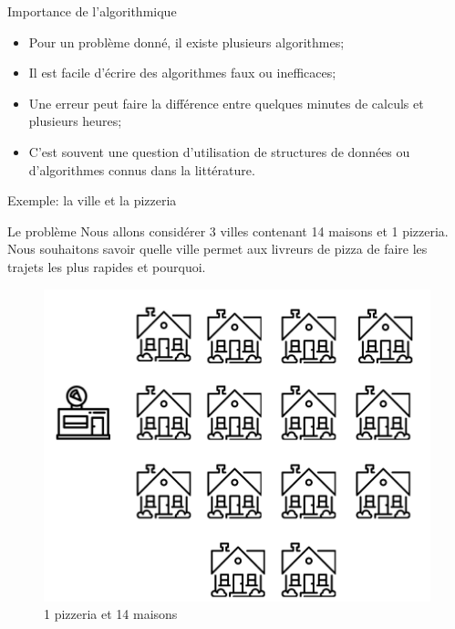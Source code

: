 \documentclass[10pt,xcolor=dvipsnames]{beamer}
\begin{document}
\begin{frame}{Importance de l'algorithmique}
    \begin{itemize}
        \item Pour un problème donné, il existe plusieurs algorithmes;
        \item Il est facile d'écrire des algorithmes faux ou inefficaces;
        \item Une erreur peut faire la différence entre quelques minutes de calculs et plusieurs heures;
        \item C'est souvent une question d'utilisation de structures de données ou d'algorithmes connus dans la littérature.
    \end{itemize}
\end{frame}


 
\begin{frame}{Exemple: la ville et la pizzeria}

    \begin{exampleblock}{Le problème}
    Nous allons considérer 3 villes contenant 14 maisons et 1 pizzeria. Nous souhaitons savoir quelle ville permet aux livreurs de pizza de faire les trajets les plus rapides et pourquoi.
    \end{exampleblock}

    \begin{figure}
        \centering
        \includegraphics[scale=0.17]{figures/CM0/Pizzeria-1.png}
        \caption{1 pizzeria et 14 maisons}
        \label{fig:piz2}
    \end{figure}
\end{frame}
\end{document}
